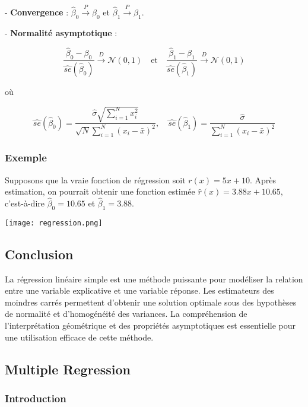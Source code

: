 \documentclass[10pt,a4paper]{article}
\begin{document}
- \textbf{Convergence} : $\hat{\beta}_{0} \xrightarrow{P} \beta_{0}$ et $\hat{\beta}_{1} \xrightarrow{P} \beta_{1}$.

- \textbf{Normalité asymptotique} :

$$
\frac{\hat{\beta}_{0}-\beta_{0}}{\hat{se}(\hat{\beta}_{0})} \xrightarrow{D} \mathcal{N}(0,1) \quad \text{et} \quad \frac{\hat{\beta}_{1}-\beta_{1}}{\hat{se}(\hat{\beta}_{1})} \xrightarrow{D} \mathcal{N}(0,1)
$$

où

$$
\hat{se}(\hat{\beta}_{0}) = \frac{\hat{\sigma} \sqrt{\sum_{i=1}^{N} x_{i}^{2}}}{\sqrt{N} \sum_{i=1}^{N}(x_{i}-\bar{x})^{2}}, \quad \hat{se}(\hat{\beta}_{1}) = \frac{\hat{\sigma}}{\sum_{i=1}^{N}(x_{i}-\bar{x})^{2}}
$$

\subsubsection*{Exemple}

Supposons que la vraie fonction de régression soit $r(x) = 5x + 10$. Après estimation, on pourrait obtenir une fonction estimée $\hat{r}(x) = 3.88x + 10.65$, c'est-à-dire $\hat{\beta}_0 = 10.65$ et $\hat{\beta}_1 = 3.88$.

\texttt{[image: regression.png]}

\subsection*{Conclusion}

La régression linéaire simple est une méthode puissante pour modéliser la relation entre une variable explicative et une variable réponse. Les estimateurs des moindres carrés permettent d'obtenir une solution optimale sous des hypothèses de normalité et d'homogénéité des variances. La compréhension de l'interprétation géométrique et des propriétés asymptotiques est essentielle pour une utilisation efficace de cette méthode.

\subsection*{Multiple Regression}

\subsubsection*{Introduction}
\end{document}
